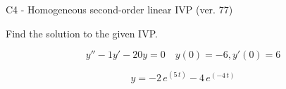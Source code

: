\begin{exercise}
  \begin{exerciseTitle}C4 - Homogeneous second-order linear IVP (ver. 77)\end{exerciseTitle}
  \begin{exerciseStatement}
    
Find the solution to the given IVP.

    
\[y''-1y'-20y = 0 \hspace{1em} y(0) = -6 , y'(0) = 6\]

  \end{exerciseStatement}
  \begin{exerciseAnswer}
    
\[y= -2 \, e^{\left(5 \, t\right)} - 4 \, e^{\left(-4 \, t\right)}\]

  \end{exerciseAnswer}
\end{exercise}